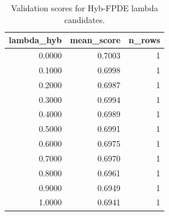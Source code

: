 \begin{table}[t]
\caption{Validation scores for Hyb-FPDE lambda candidates.}
\label{tab:lambda_distribution_computed}
\centering
\begin{tabular}{rrr}
\toprule
lambda\_hyb & mean\_score & n\_rows \\
\midrule
0.0000 & 0.7003 & 1 \\
0.1000 & 0.6998 & 1 \\
0.2000 & 0.6987 & 1 \\
0.3000 & 0.6994 & 1 \\
0.4000 & 0.6989 & 1 \\
0.5000 & 0.6991 & 1 \\
0.6000 & 0.6975 & 1 \\
0.7000 & 0.6970 & 1 \\
0.8000 & 0.6961 & 1 \\
0.9000 & 0.6949 & 1 \\
1.0000 & 0.6941 & 1 \\
\bottomrule
\end{tabular}

\end{table}
